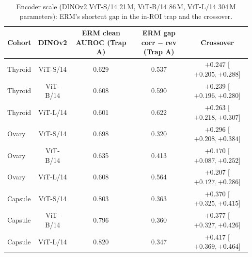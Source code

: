 \begin{table}[H]\centering\scriptsize
\caption{Encoder scale (DINOv2 ViT-S/14 21\,M, ViT-B/14 86\,M, ViT-L/14 304\,M parameters): ERM's shortcut gap in the in-ROI trap and the crossover.}\label{tab:scale}
\begin{tabular}{lcccc}\toprule
Cohort & DINOv2 & ERM clean AUROC (Trap A) & ERM gap corr $-$ rev (Trap A) & Crossover \\\midrule
Thyroid & ViT-S/14 & 0.629 & 0.537 & $+0.247$ [$+0.205, +0.288$] \\
Thyroid & ViT-B/14 & 0.608 & 0.590 & $+0.239$ [$+0.196, +0.280$] \\
Thyroid & ViT-L/14 & 0.601 & 0.622 & $+0.263$ [$+0.218, +0.307$] \\
Ovary & ViT-S/14 & 0.698 & 0.320 & $+0.296$ [$+0.208, +0.384$] \\
Ovary & ViT-B/14 & 0.635 & 0.413 & $+0.170$ [$+0.087, +0.252$] \\
Ovary & ViT-L/14 & 0.608 & 0.564 & $+0.207$ [$+0.127, +0.286$] \\
Capsule & ViT-S/14 & 0.803 & 0.363 & $+0.370$ [$+0.325, +0.415$] \\
Capsule & ViT-B/14 & 0.796 & 0.360 & $+0.377$ [$+0.327, +0.426$] \\
Capsule & ViT-L/14 & 0.820 & 0.347 & $+0.417$ [$+0.369, +0.464$] \\
\bottomrule\end{tabular}
\end{table}
